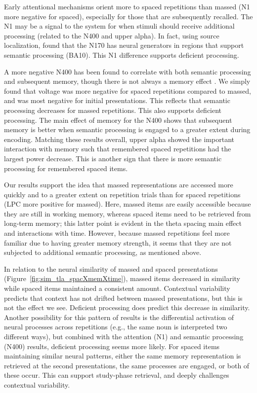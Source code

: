 Early attentional mechanisms orient more to spaced repetitions than massed (N1 more negative for spaced), especially for those that are subsequently recalled.  The N1 may be a signal to the system for when stimuli should receive additional processing (related to the N400 and upper alpha).  In fact, using source localization,  found that the N170 has neural generators in regions that support semantic processing (BA10).  This N1 difference supports deficient processing.


A more negative N400 has been found to correlate with both semantic processing and subsequent memory, though there is not always a memory effect \cite<reviewed in>{FrieJohn2000}.  We simply found that voltage was more negative for spaced repetitions compared to massed, and was most negative for initial presentations.  This reflects that semantic processing decreases for massed repetitions.  This also supports deficient processing.  The main effect of memory for the N400 shows that subsequent memory is better when semantic processing is engaged to a greater extent during encoding.  Matching these results overall, upper alpha showed the important interaction with memory such that remembered spaced repetitions had the largest power decrease.  This is another sign that there is more semantic processing for remembered spaced items.

Our results support the idea that massed representations are accessed more quickly and to a greater extent on repetition trials than for spaced repetitions (LPC more positive for massed).  Here, massed items are easily accessible because they are still in working memory, whereas spaced items need to be retrieved from long-term memory; this latter point is evident in the theta spacing main effect and interactions with time.  However, because massed repetitions feel more familiar due to having greater memory strength, it seems that they are not subjected to additional semantic processing, as mentioned above.

\cbstart
In relation to the neural similarity of massed and spaced presentations (Figure~\ref{fig:sim_tla_spacXmemXtime}), massed items decreased in similarity while spaced items maintained a consistent amount.  Contextual variability predicts that context has not drifted between massed presentations, but this is not the effect we see.  Deficient processing does predict this decrease in similarity.  Another possibility for this pattern of results is the differential activation of neural processes across repetitions (e.g., the same noun is interpreted two different ways), but combined with the attention (N1) and semantic processing (N400) results, deficient processing seems more likely.  For spaced items maintaining similar neural patterns, either the same memory representation is retrieved at the second presentations, the same processes are engaged, or both of these occur.  This can support study-phase retrieval, and deeply challenges contextual variability.
\cbend

